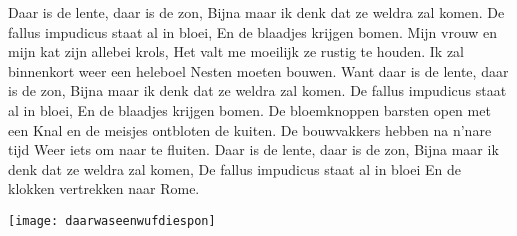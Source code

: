 \beginverse*
Daar is de lente, daar is de zon,
Bijna maar ik denk dat ze weldra zal komen.
De fallus impudicus staat al in bloei,
En de blaadjes krijgen bomen. 
\endverse
\beginverse*
Mijn vrouw en mijn kat zijn allebei krols,
Het valt me moeilijk ze rustig te houden.
Ik zal binnenkort weer een heleboel
Nesten moeten bouwen. 
\endverse
\beginverse*
Want daar is de lente, daar is de zon,
Bijna maar ik denk dat ze weldra zal komen.
De fallus impudicus staat al in bloei,
En de blaadjes krijgen bomen.
\endverse
\beginverse*
De bloemknoppen barsten open met een 
Knal en de meisjes ontbloten de kuiten.
De bouwvakkers hebben na n’nare tijd
Weer iets om naar te fluiten. 
\endverse
\beginverse*
Daar is de lente, daar is de zon,
Bijna maar ik denk dat ze weldra zal komen,
De fallus impudicus staat al in bloei
En de klokken vertrekken naar Rome. 
\endverse
\endsong
\begin{intersong}
    \texttt{[image: daarwaseenwufdiespon]}
\end{intersong}